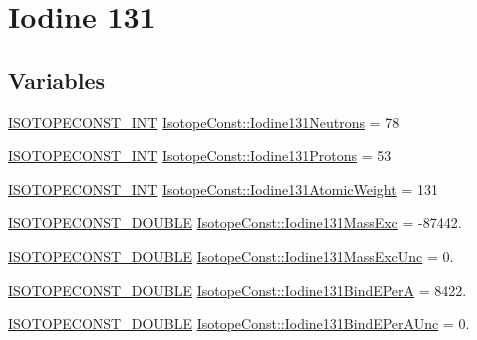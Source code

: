 \hypertarget{group___isotope_const-_iodine-_i131}{}\section{Iodine 131}
\label{group___isotope_const-_iodine-_i131}
\subsection*{Variables}
\begin{DoxyCompactItemize}
\item 
\mbox{\hyperlink{group___isotope_const-_macros_ga5f18360b3e99483a35c32d789e62621c}{I\+S\+O\+T\+O\+P\+E\+C\+O\+N\+S\+T\+\_\+\+I\+NT}} \mbox{\hyperlink{group___isotope_const-_iodine-_i131_gaea7c6ba042736c884eb5840fe29a6c78}{Isotope\+Const\+::\+Iodine131\+Neutrons}} = 78
\item 
\mbox{\hyperlink{group___isotope_const-_macros_ga5f18360b3e99483a35c32d789e62621c}{I\+S\+O\+T\+O\+P\+E\+C\+O\+N\+S\+T\+\_\+\+I\+NT}} \mbox{\hyperlink{group___isotope_const-_iodine-_i131_ga919ab530e455c662f40be891b3e38ca5}{Isotope\+Const\+::\+Iodine131\+Protons}} = 53
\item 
\mbox{\hyperlink{group___isotope_const-_macros_ga5f18360b3e99483a35c32d789e62621c}{I\+S\+O\+T\+O\+P\+E\+C\+O\+N\+S\+T\+\_\+\+I\+NT}} \mbox{\hyperlink{group___isotope_const-_iodine-_i131_gaa835c71998531ec2809fe08a7a8e7c1f}{Isotope\+Const\+::\+Iodine131\+Atomic\+Weight}} = 131
\item 
\mbox{\hyperlink{group___isotope_const-_macros_ga8f45a7272ce02c0b4c65c44636ed719a}{I\+S\+O\+T\+O\+P\+E\+C\+O\+N\+S\+T\+\_\+\+D\+O\+U\+B\+LE}} \mbox{\hyperlink{group___isotope_const-_iodine-_i131_ga6fe09dad4d2a17aab484225f1d751194}{Isotope\+Const\+::\+Iodine131\+Mass\+Exc}} = -\/87442.
\item 
\mbox{\hyperlink{group___isotope_const-_macros_ga8f45a7272ce02c0b4c65c44636ed719a}{I\+S\+O\+T\+O\+P\+E\+C\+O\+N\+S\+T\+\_\+\+D\+O\+U\+B\+LE}} \mbox{\hyperlink{group___isotope_const-_iodine-_i131_ga83bd9cadfb2e160c056c39257ee6b0c8}{Isotope\+Const\+::\+Iodine131\+Mass\+Exc\+Unc}} = 0.
\item 
\mbox{\hyperlink{group___isotope_const-_macros_ga8f45a7272ce02c0b4c65c44636ed719a}{I\+S\+O\+T\+O\+P\+E\+C\+O\+N\+S\+T\+\_\+\+D\+O\+U\+B\+LE}} \mbox{\hyperlink{group___isotope_const-_iodine-_i131_ga3ea8c842bca5199b72d33350a253f776}{Isotope\+Const\+::\+Iodine131\+Bind\+E\+PerA}} = 8422.
\item 
\mbox{\hyperlink{group___isotope_const-_macros_ga8f45a7272ce02c0b4c65c44636ed719a}{I\+S\+O\+T\+O\+P\+E\+C\+O\+N\+S\+T\+\_\+\+D\+O\+U\+B\+LE}} \mbox{\hyperlink{group___isotope_const-_iodine-_i131_ga3b0a031be500ff25e46e49b8b29abd57}{Isotope\+Const\+::\+Iodine131\+Bind\+E\+Per\+A\+Unc}} = 0.

\end{DoxyCompactItemize}
